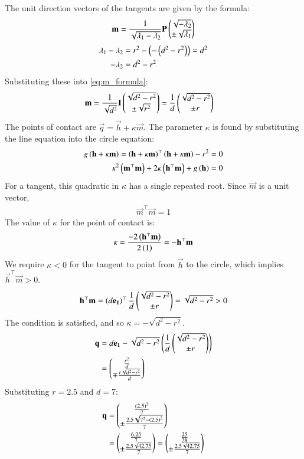 \documentclass[journal]{IEEEtran}
\begin{document}
The unit direction vectors of the tangents are given by the formula:
\begin{align}
    \mathbf{m} = \frac{1}{\sqrt{\lambda_1-\lambda_2}}\mathbf{P}\begin{pmatrix}\sqrt{-\lambda_2} \\ \pm\sqrt{\lambda_1}\end{pmatrix} \label{eq:m_formula}
\end{align}
\begin{align}
    \lambda_1-\lambda_2 &= r^2 - \left(-\left(d^2-r^2\right)\right) = d^2 \\
    -\lambda_2 &= d^2-r^2
\end{align}
Substituting these into \eqref{eq:m_formula}:
\begin{align}
    \mathbf{m} &= \frac{1}{\sqrt{d^2}}\mathbf{I}\begin{pmatrix}\sqrt{d^2-r^2} \\ \pm\sqrt{r^2}\end{pmatrix} = \frac{1}{d}\begin{pmatrix}\sqrt{d^2-r^2} \\ \pm r\end{pmatrix}
\end{align}
The points of contact are $\vec{q} = \vec{h} + \kappa\vec{m}$. The parameter $\kappa$ is found by substituting the line equation into the circle equation:
\begin{align}
    g\left(\mathbf{h}+\kappa\mathbf{m}\right) = \left(\mathbf{h}+\kappa\mathbf{m}\right)^\top\left(\mathbf{h}+\kappa\mathbf{m}\right) - r^2 = 0 \\
    \kappa^2\left(\mathbf{m}^\top\mathbf{m}\right) + 2\kappa\left(\mathbf{h}^\top\mathbf{m}\right) + g\left(\mathbf{h}\right) = 0
\end{align}
For a tangent, this quadratic in $\kappa$ has a single repeated root. Since $\vec{m}$ is a unit vector, 
\begin{align}
	\vec{m}^\top\vec{m}=1
\end{align}
The value of $\kappa$ for the point of contact is:
\begin{align}
    \kappa = \frac{-2\left(\mathbf{h}^\top\mathbf{m}\right)}{2\left(1\right)} = -\mathbf{h}^\top\mathbf{m}
\end{align}
We require $\kappa<0$ for the tangent to point from $\vec{h}$ to the circle, which implies $\vec{h}^\top\vec{m}>0$.
\begin{align}
    \mathbf{h}^\top\mathbf{m} = \left(d\mathbf{e_1}\right)^\top\frac{1}{d}\begin{pmatrix}\sqrt{d^2-r^2} \\ \pm r\end{pmatrix} = \sqrt{d^2-r^2} > 0
\end{align}
The condition is satisfied, and so $\kappa = -\sqrt{d^2-r^2}$.
\begin{align}
    \mathbf{q} &= d\mathbf{e_1} - \sqrt{d^2-r^2}\left(\frac{1}{d}\begin{pmatrix}\sqrt{d^2-r^2} \\ \pm r\end{pmatrix}\right) \\
    &= \begin{pmatrix}\frac{r^2}{d} \\ \mp \frac{r\sqrt{d^2-r^2}}{d}\end{pmatrix}
\end{align}
Substituting $r=2.5$ and $d=7$:
\begin{align}
    \mathbf{q} &= \begin{pmatrix}\frac{\left(2.5\right)^2}{7} \\ \pm\frac{2.5\sqrt{7^2 - \left(2.5\right)^2}}{7}\end{pmatrix} \\
    &= \begin{pmatrix}\frac{6.25}{7} \\ \pm\frac{2.5\sqrt{42.75}}{7}\end{pmatrix} = \begin{pmatrix}\frac{25}{28} \\ \pm\frac{2.5\sqrt{42.75}}{7}\end{pmatrix}
\end{align}
\end{document}
